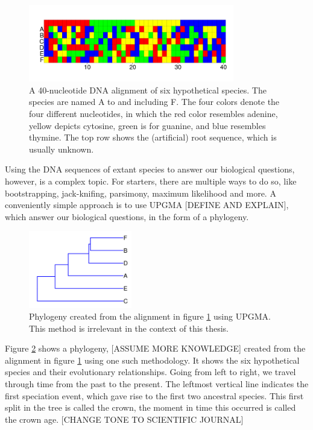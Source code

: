 \begin{figure}[H]
  \includegraphics[width=0.8\textwidth]{alignment_40_with_root.png}
  \caption{
    A 40-nucleotide DNA alignment of six hypothetical species. The species
    are named A to and including F. 
    The four colors denote the four different nucleotides,
    in which the red color resembles adenine, yellow depicts cytosine, 
    green is for guanine, and blue resembles thymine. The top
    row shows the (artificial) root sequence, which is usually unknown.
  }
  \label{fig:alignment}
\end{figure}

Using the DNA sequences of extant species to answer our biological questions,
however, is a complex topic. For starters, there are multiple 
ways to do so, like bootstrapping, 
jack-knifing, parsimony, maximum likelihood and more.
A conveniently simple approach is to use UPGMA [DEFINE AND EXPLAIN], which answer our biological
questions, in the form of a phylogeny.


\begin{figure}[H]
  \includegraphics[width=0.4\textwidth]{phylogeny_40_upgma.png}
  \caption{
    Phylogeny created from the alignment in figure \ref{fig:alignment} 
    using UPGMA. 
    This method is irrelevant in the context of this thesis.
  }
  \label{fig:phylogeny_upgma}
\end{figure}

Figure \ref{fig:phylogeny_upgma} shows a phylogeny, [ASSUME MORE KNOWLEDGE]
created from the alignment 
in figure \ref{fig:alignment} using one such methodology.
It shows the six hypothetical species and their evolutionary 
relationships. Going from left to right, we travel through time from 
the past to the present. 
The leftmost vertical line indicates the first speciation event, 
which gave rise to the first two ancestral species. 
This first split in the tree is called the crown,
the moment in time this occurred is called the crown age. [CHANGE TONE TO SCIENTIFIC JOURNAL]


